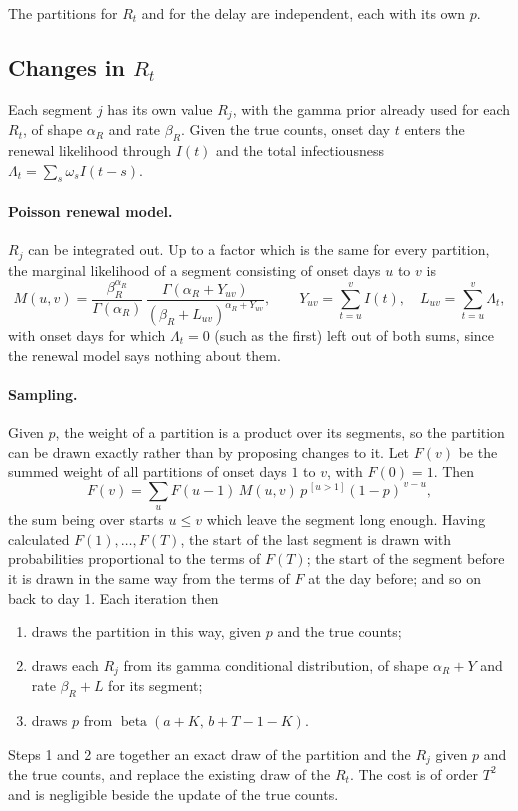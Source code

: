 \documentclass[11pt,a4paper]{article}
\begin{document}
The partitions for $R_t$ and for the delay are independent, each with its own
$p$.

\subsection{Changes in $R_t$}

Each segment $j$ has its own value $R_j$, with the gamma prior already used
for each $R_t$, of shape $\alpha_R$ and rate $\beta_R$. Given the true counts,
onset day $t$ enters the renewal likelihood through $I(t)$ and the total
infectiousness $\Lambda_t=\sum_{s}\omega_s I(t-s)$.

\paragraph{Poisson renewal model.} $R_j$ can be integrated out. Up to a factor
which is the same for every partition, the marginal likelihood of a segment
consisting of onset days $u$ to $v$ is
\begin{equation}\label{eq:segmentmarginal}
M(u,v) = \frac{\beta_R^{\alpha_R}}{\Gamma(\alpha_R)}\,
\frac{\Gamma(\alpha_R+Y_{uv})}{(\beta_R+L_{uv})^{\alpha_R+Y_{uv}}},
\qquad Y_{uv}=\sum_{t=u}^{v}I(t),\quad L_{uv}=\sum_{t=u}^{v}\Lambda_t,
\end{equation}
with onset days for which $\Lambda_t=0$ (such as the first) left out of both
sums, since the renewal model says nothing about them.

\paragraph{Sampling.} Given $p$, the weight of a partition is a product over
its segments, so the partition can be drawn exactly rather than by proposing
changes to it. Let $F(v)$ be the summed weight of all partitions of onset days
$1$ to $v$, with $F(0)=1$. Then
\begin{equation}\label{eq:partitionforward}
F(v)=\sum_{u}F(u-1)\,M(u,v)\,p^{\,[u>1]}(1-p)^{\,v-u},
\end{equation}
the sum being over starts $u\le v$ which leave the segment long enough. Having
calculated $F(1),\dots,F(T)$, the start of the last segment is drawn with
probabilities proportional to the terms of $F(T)$; the start of the segment
before it is drawn in the same way from the terms of $F$ at the day before;
and so on back to day 1. Each iteration then
\begin{enumerate}[itemsep=2pt]
\item draws the partition in this way, given $p$ and the true counts;
\item draws each $R_j$ from its gamma conditional distribution, of shape
$\alpha_R+Y$ and rate $\beta_R+L$ for its segment;
\item draws $p$ from $\operatorname{beta}(a+K,\,b+T-1-K)$.
\end{enumerate}
Steps 1 and 2 are together an exact draw of the partition and the $R_j$ given
$p$ and the true counts, and replace the existing draw of the $R_t$. The cost
is of order $T^2$ and is negligible beside the update of the true counts.
\end{document}
